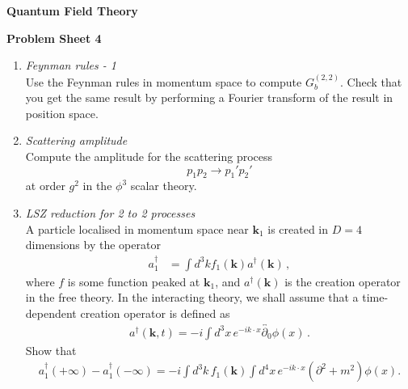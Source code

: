 \documentclass[12pt,a4paper]{article}
\begin{document}
\begin{center}
\textbf{ Quantum Field Theory}\\[\baselineskip]
\end{center}
\textbf{ Problem Sheet 4}

\begin{enumerate}
  \item \emph{ Feynman rules - 1}\\

    Use the Feynman rules in momentum space to compute
    $G^{(2,2)}_b$. Check that you get the same result by performing a
    Fourier transform of the result in position space.

    \bigskip

  \item \emph{ Scattering amplitude} \\
    
      Compute the amplitude for the scattering process
      \[
        p_1 p_2 \longrightarrow p_1' p_2'
      \]
      at order $g^2$ in the $\phi^3$ scalar theory. 


    \bigskip
    
  \item \emph{ LSZ reduction for 2 to 2 processes}\\
    
    A particle localised in momentum space near $\mathbf{k}_1$ is
    created in $D=4$ dimensions by the operator
    \begin{align}
      \label{eq:1}
      a_1^\dagger &= \int d^3k  f_1(\mathbf{k}) a^\dagger(\mathbf{k})\, ,
    \end{align}
    where $f$ is some function peaked at $\mathbf{k}_1$, and
    $a^\dagger(\mathbf{k})$ is the creation operator in the free
    theory. In the interacting theory, we shall assume that a
    time-dependent creation operator is defined as
    \begin{align}
      \label{eq:2}
      a^\dagger(\mathbf{k},t) = -i \int d^3x\, e^{-ik\cdot x}
      \overleftrightarrow{\partial_0} \phi(x)\, .
    \end{align}
    Show that
    \begin{align}
      \label{eq:3}
      a_1^\dagger(+\infty) - a_1^\dagger(-\infty) = 
      -i \int d^3k\, f_1(\mathbf{k}) \int d^4x\,
      e^{-ik\cdot x} (\partial^2+m^2) \phi(x).
    \end{align}
 

\end{enumerate}
\end{document}
